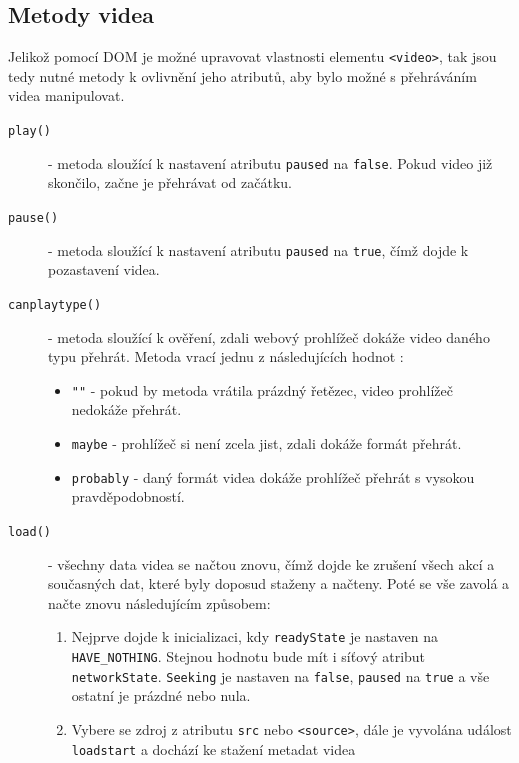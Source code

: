 \newpage

\subsection{Metody videa}
Jelikož pomocí DOM je možné upravovat vlastnosti elementu \texttt{<video>}, tak jsou tedy nutné metody k ovlivnění jeho atributů, aby bylo možné s přehráváním videa manipulovat.

\begin{description}
	\item[\texttt{play()}] - metoda sloužící k nastavení atributu \texttt{paused} na \texttt{false}. Pokud video již skončilo, začne je přehrávat od začátku.
	
	\item[\texttt{pause()}] - metoda sloužící k nastavení atributu \texttt{paused} na \texttt{true}, čímž dojde k pozastavení videa.
	
	\item[\texttt{canplaytype()}] - metoda sloužící k ověření, zdali webový prohlížeč dokáže video daného typu přehrát. Metoda vrací jednu z následujících hodnot \cite{html5}:
	 	\begin{itemize}		
			\item \texttt{""} - pokud by metoda vrátila prázdný řetězec, video prohlížeč nedokáže přehrát.
			\item \texttt{maybe} - prohlížeč si není zcela jist, zdali dokáže formát přehrát.
			\item \texttt{probably} - daný formát videa dokáže prohlížeč přehrát s vysokou pravděpodobností.
		\end{itemize} 
	\item[\texttt{load()}] - všechny data videa se načtou znovu, čímž dojde ke zrušení všech akcí a současných dat, které byly doposud staženy a načteny. Poté se vše zavolá a načte znovu následujícím způsobem:
	 	\begin{enumerate}
			\item Nejprve dojde k inicializaci, kdy \texttt{readyState} je nastaven na \texttt{HAVE\_NOTHING}. Stejnou hodnotu bude mít i síťový atribut \texttt{networkState}. \texttt{Seeking} je nastaven na \texttt{false}, \texttt{paused}  na \texttt{true} a vše ostatní je prázdné nebo nula.	
			
			\item Vybere se zdroj z atributu \texttt{src} nebo \texttt{<source>}, dále je vyvolána událost \texttt{loadstart} a dochází ke stažení metadat videa
			

\end{enumerate}
\end{description}
